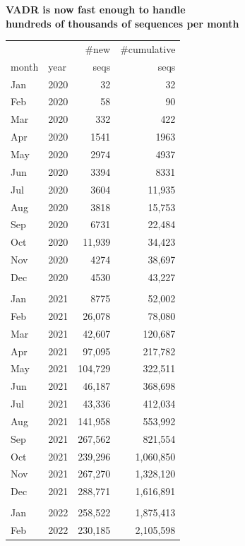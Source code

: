 \documentclass[landscape]{slides}
\begin{document}
\begin{slide}
\begin{center}
\normalsize{\textbf{VADR is now fast enough to handle \\ hundreds of thousands of sequences per month}}
\end{center}

\tiny
\begin{center}
\begin{tabular}{llrr}
          &          &\#new     &\#cumulative\\
month     &year      &seqs      &seqs      \\ \hline
Jan       & 2020     &32        &32        \\ 
Feb       & 2020     &58        &90        \\ 
Mar       & 2020     &332       &422       \\ 
Apr       & 2020     &1541      &1963      \\ 
May       & 2020     &2974      &4937      \\ 
Jun       & 2020     &3394      &8331      \\ 
Jul       & 2020     &3604      &11,935    \\ 
Aug       & 2020     &3818      &15,753    \\ 
Sep       & 2020     &6731      &22,484    \\ 
Oct       & 2020     &11,939    &34,423    \\ 
Nov       & 2020     &4274      &38,697    \\ 
Dec       & 2020     &4530      &43,227    \\ 
& & & \\
Jan       & 2021     &8775      &52,002    \\ 
Feb       & 2021     &26,078    &78,080    \\ 
Mar       & 2021     &42,607    &120,687   \\ 
Apr       & 2021     &97,095    &217,782   \\ 
May       & 2021     &104,729   &322,511   \\ 
Jun       & 2021     &46,187    &368,698   \\ 
Jul       & 2021     &43,336    &412,034   \\ 
Aug       & 2021     &141,958   &553,992   \\ 
Sep       & 2021     &267,562   &821,554   \\ 
Oct       & 2021     &239,296   &1,060,850 \\ 
Nov       & 2021     &267,270   &1,328,120 \\ 
Dec       & 2021     &288,771   &1,616,891 \\ 
& & & \\
Jan       & 2022     &258,522   &1,875,413 \\ 
Feb       & 2022     &230,185   &2,105,598 \\ 
\end{tabular}
\end{center}

\vfill
\end{slide}
\end{document}
